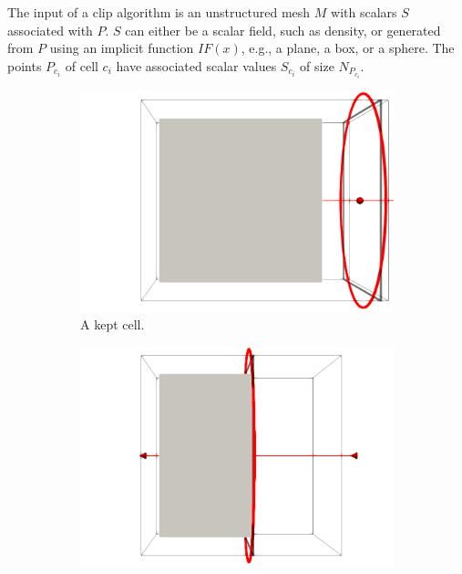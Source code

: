 \documentclass{egpubl}
\begin{document}
The input of a clip algorithm is an unstructured mesh $M$ with scalars $S$ associated with $P$. $S$ can either be a scalar field, such as density, or generated from $P$ using an implicit function $IF(x)$, e.g., a plane, a box, or a sphere. The points $P_{c_i}$ of cell $c_i$ have associated scalar values $S_{c_i}$ of size $N_{P_{c_i}}$.

\begin{figure}[h]
  \centering
  \begin{subfigure}[t]{0.32\linewidth}
    \centering
    \includegraphics[width=\linewidth]{Figures/Kept-Cell.png}
    \caption{A kept cell.}
    \label{fig:kept-cell}
  \end{subfigure}
  \begin{subfigure}[t]{0.32\linewidth}
    \centering
    \includegraphics[width=\linewidth]{Figures/Clipped-Cell.png}

\end{subfigure}
\end{figure}
\end{document}

